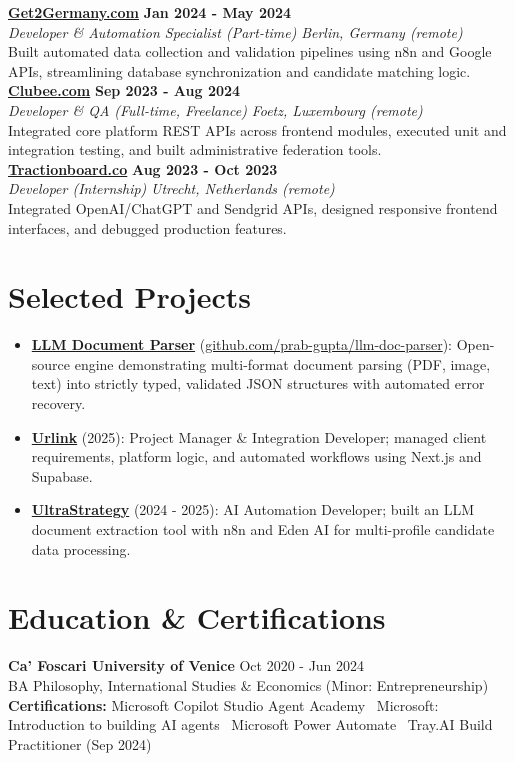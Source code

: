 \documentclass[a4paper,10pt]{article}
\newcommand{\role}[4]{%
  \textbf{#1} \hfill \textbf{#2}\\[1pt]%
  \textit{#3} \hfill \textit{#4}\\[2pt]%
}
\begin{document}
\role{\href{https://get2germany.com}{Get2Germany.com}}{Jan 2024 - May 2024}{Developer \& Automation Specialist (Part-time)}{Berlin, Germany (remote)}
Built automated data collection and validation pipelines using n8n and Google APIs, streamlining database synchronization and candidate matching logic.\\[1pt]

\role{\href{https://clubee.com}{Clubee.com}}{Sep 2023 - Aug 2024}{Developer \& QA (Full-time, Freelance)}{Foetz, Luxembourg (remote)}
Integrated core platform REST APIs across frontend modules, executed unit and integration testing, and built administrative federation tools.\\[1pt]

\role{\href{https://tractionboard.co}{Tractionboard.co}}{Aug 2023 - Oct 2023}{Developer (Internship)}{Utrecht, Netherlands (remote)}
Integrated OpenAI/ChatGPT and Sendgrid APIs, designed responsive frontend interfaces, and debugged production features.

\section{Selected Projects}
\begin{itemize}
  \item \textbf{\href{https://github.com/prab-gupta/llm-doc-parser}{LLM Document Parser}} (\href{https://github.com/prab-gupta/llm-doc-parser}{github.com/prab-gupta/llm-doc-parser}): Open-source engine demonstrating multi-format document parsing (PDF, image, text) into strictly typed, validated JSON structures with automated error recovery.
  \item \textbf{\href{https://smarturlink.com/}{Urlink}} (2025): Project Manager \& Integration Developer; managed client requirements, platform logic, and automated workflows using Next.js and Supabase.
  \item \textbf{\href{https://ultrastrategy.com}{UltraStrategy}} (2024 - 2025): AI Automation Developer; built an LLM document extraction tool with n8n and Eden AI for multi-profile candidate data processing.
\end{itemize}

\section{Education \& Certifications}
\textbf{Ca' Foscari University of Venice} \hfill Oct 2020 - Jun 2024\\
BA Philosophy, International Studies \& Economics (Minor: Entrepreneurship)\\[1pt]
\textbf{Certifications:} Microsoft Copilot Studio Agent Academy \textbullet\ Microsoft: Introduction to building AI agents \textbullet\ Microsoft Power Automate \textbullet\ Tray.AI Build Practitioner (Sep 2024)
\end{document}
